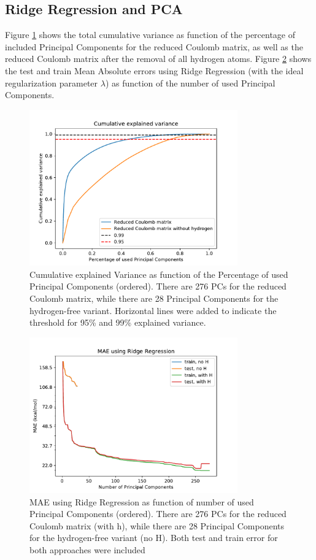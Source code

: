 \documentclass[11pt,a4paper,notitlepage]{article}
\begin{document}
\subsection{Ridge Regression and PCA}
Figure  \ref{fig:Variance} shows the  total cumulative variance  as function of the percentage of included Principal Components for the reduced Coulomb matrix, as well as the reduced Coulomb matrix after the removal of all hydrogen atoms. Figure \ref{fig:Errors_PCA_ridge} shows the test and train Mean Absolute errors using Ridge Regression (with the ideal regularization parameter $\lambda$) as function of the number of used Principal Components. 


\begin{figure}[H]
\centering
\includegraphics[width=0.8\textwidth]{Cumulative_variance.pdf}
\caption[Cumulative Explained Variance]{Cumulative explained Variance as function of the Percentage of used Principal Components (ordered). There are 276 PCs for the reduced Coulomb matrix, while there are 28 Principal Components for the hydrogen-free variant. Horizontal lines were added to indicate the threshold for 95\% and 99\% explained variance.} \label{fig:Variance}
\end{figure}
\begin{figure}[H]
\centering
\includegraphics[width=0.8\textwidth]{Ridge_error.pdf}
\caption[Ridge Error]{MAE using Ridge Regression as function of number of used Principal Components (ordered). There are 276 PCs for the reduced Coulomb matrix (with h), while there are 28 Principal Components for the hydrogen-free variant (no H). Both test and train error for both approaches were included} \label{fig:Errors_PCA_ridge}
\end{figure}
\end{document}
